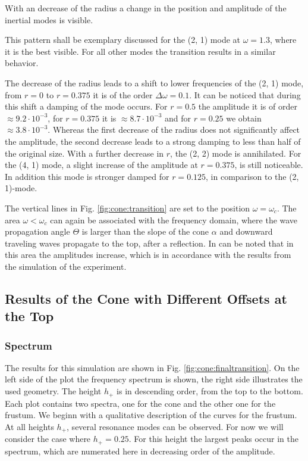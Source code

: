 With an decrease of the radius a change in the position and amplitude of the
inertial modes is visible.

This pattern shall be exemplary discussed  for the (2, 1) mode at $\omega=1.3$, where it is the best visible.
For all other modes the transition results in a similar behavior.

The decrease of the radius leads to a shift to lower frequencies of the (2, 1) mode,
from $r=0$ to $r=0.375$ it is of the order $\Delta \omega=0.1$.
It can be noticed that during this shift a damping of the mode occurs.
For $r=0.5$ the amplitude it is of order $\approx9.2\cdot10^{-3}$, for $r=0.375$ it is
$\approx8.7\cdot10^{-3}$ and for $r=0.25$ we obtain $\approx3.8\cdot10^{-3}$.
Whereas the first decrease of the radius does not significantly affect the amplitude,
the second decrease leads to a strong damping to less than half of the original size.
With a further decrease in $r$, the (2, 2) mode is annihilated.
For the (4, 1) mode, a slight increase of the amplitude at $r=0.375$, is still noticeable.
In addition this mode is stronger damped for $r=0.125$, in comparison to the (2, 1)-mode.

The vertical lines in Fig. \ref{fig:cone:transition} are set to the position $\omega=\omega_c$.
The area $\omega<\omega_c$ can again be associated with the frequency domain, where the wave propagation angle $\Theta$ is larger than
the  slope of the cone $\alpha$ and downward traveling waves propagate to the top, after a reflection.
In can be noted that in this area the amplitudes increase, which is in accordance with the
results from the simulation of the experiment.

\clearpage


\subsection{Results of the Cone with Different Offsets at the Top}
\subsubsection{Spectrum}

The results for this simulation are shown in Fig. \ref{fig:cone:finaltransition}.
On the left side of the plot  the frequency spectrum is shown, the right side illustrates the used geometry.
The height $h_+$ is in descending order, from the top to the bottom.
Each plot contains two spectra, one for the cone  and the other one for the frustum.
We beginn with a qualitative description of the curves for the frustum.\\
At all heights $h_+$, several resonance modes can be observed. For now we will consider the case where ${h_+=0.25}$.
For this height the largest peaks occur in the spectrum, which are numerated here in decreasing order of the amplitude.

